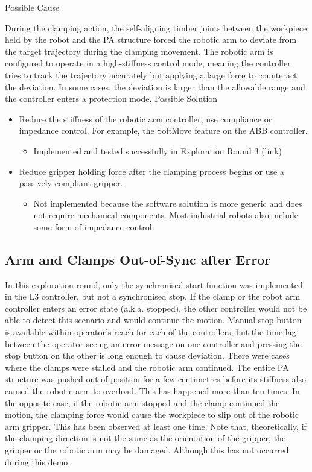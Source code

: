 Possible Cause

During the clamping action, the self-aligning timber joints between the workpiece held by the robot and the PA structure forced the robotic arm to deviate from the target trajectory during the clamping movement. The robotic arm is configured to operate in a high-stiffness control mode, meaning the controller tries to track the trajectory accurately but applying a large force to counteract the deviation. In some cases, the deviation is larger than the allowable range and the controller enters a protection mode.
Possible Solution
\begin{itemize}
    \item Reduce the stiffness of the robotic arm controller, use compliance or impedance control. For example, the SoftMove feature on the ABB controller.
    \begin{itemize}
        \item Implemented and tested successfully in Exploration Round 3 (link)
    \end{itemize}
    \item Reduce gripper holding force after the clamping process begins or use a passively compliant gripper.
    \begin{itemize}
        \item Not implemented because the software solution is more generic and does not require mechanical components. Most industrial robots also include some form of impedance control.
    \end{itemize}
\end{itemize}

\subsection{Arm and Clamps Out-of-Sync after Error}
\label{subsection:exploration_2_arm_and_clamps_out_of_sync_after_error}

In this exploration round, only the synchronised start function was implemented in the L3 controller, but not a synchronised stop. If the clamp or the robot arm controller enters an error state (a.k.a. stopped), the other controller would not be able to detect this scenario and would continue the motion. Manual stop button is available within operator’s reach for each of the controllers, but the time lag between the operator seeing an error message on one controller and pressing the stop button on the other is long enough to cause deviation.
There were cases where the clamps were stalled and the robotic arm continued. The entire PA structure was pushed out of position for a few centimetres before its stiffness also caused the robotic arm to overload. This has happened more than ten times.
In the opposite case, if the robotic arm stopped and the clamp continued the motion, the clamping force would cause the workpiece to slip out of the robotic arm gripper. This has been observed at least one time.
Note that, theoretically, if the clamping direction is not the same as the orientation of the gripper, the gripper or the robotic arm may be damaged. Although this has not occurred during this demo.

